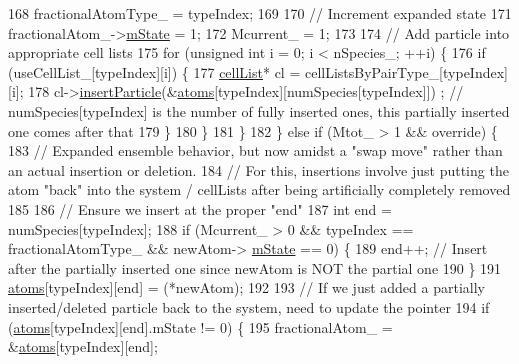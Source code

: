 \begin{DoxyCode}
168                     fractionalAtomType\_ = typeIndex;
169 
170                     \textcolor{comment}{// Increment expanded state}
171                     fractionalAtom\_->\hyperlink{classatom_a3cb00c0c5b7533657e05af6ff4a42740}{mState} = 1;
172                     Mcurrent\_ = 1;
173 
174                     \textcolor{comment}{// Add particle into appropriate cell lists}
175                     \textcolor{keywordflow}{for} (\textcolor{keywordtype}{unsigned} \textcolor{keywordtype}{int} i = 0; i < nSpecies\_; ++i) \{
176                         \textcolor{keywordflow}{if} (useCellList\_[typeIndex][i]) \{
177                             \hyperlink{classcell_list}{cellList}* cl = cellListsByPairType\_[typeIndex][i];
178                             cl->\hyperlink{classcell_list_a56c0012eed483e47248f9065bfc70fce}{insertParticle}(&\hyperlink{classsim_system_a90421b19082f7fb8fc23b7264b1161e4}{atoms}[typeIndex][numSpecies[typeIndex]])
      ; \textcolor{comment}{// numSpecies[typeIndex] is the number of fully inserted ones, this partially inserted one comes after
       that}
179                         \}
180                     \}
181                 \}
182             \} \textcolor{keywordflow}{else} \textcolor{keywordflow}{if} (Mtot\_ > 1 && \textcolor{keyword}{override}) \{
183                 \textcolor{comment}{// Expanded ensemble behavior, but now amidst a "swap move" rather than an actual insertion
       or deletion.}
184                 \textcolor{comment}{// For this, insertions involve just putting the atom "back" into the system / cellLists
       after being artificially completely removed}
185 
186                 \textcolor{comment}{// Ensure we insert at the proper "end"}
187                 \textcolor{keywordtype}{int} end = numSpecies[typeIndex];
188                 \textcolor{keywordflow}{if} (Mcurrent\_ > 0 && typeIndex == fractionalAtomType\_ && newAtom->
      \hyperlink{classatom_a3cb00c0c5b7533657e05af6ff4a42740}{mState} == 0) \{
189                     end++; \textcolor{comment}{// Insert after the partially inserted one since newAtom is NOT the partial one}
190                 \}
191                 \hyperlink{classsim_system_a90421b19082f7fb8fc23b7264b1161e4}{atoms}[typeIndex][end] = (*newAtom);
192 
193                 \textcolor{comment}{// If we just added a partially inserted/deleted particle back to the system, need to
       update the pointer}
194                 \textcolor{keywordflow}{if} (\hyperlink{classsim_system_a90421b19082f7fb8fc23b7264b1161e4}{atoms}[typeIndex][end].mState != 0) \{
195                     fractionalAtom\_ = &\hyperlink{classsim_system_a90421b19082f7fb8fc23b7264b1161e4}{atoms}[typeIndex][end];

\end{DoxyCode}
